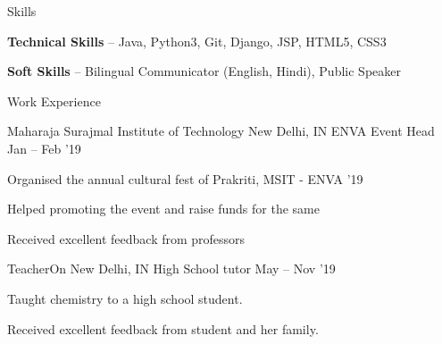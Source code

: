 \documentclass{resume} %
\begin{document}
\begin{rSection}{Skills}
  \begin{rSkillSection}
    \item \textbf {Technical Skills} -- Java, Python3, Git, Django, JSP, HTML5, CSS3
    \vspace{3mm}
    \item \textbf {Soft Skills} --  Bilingual Communicator (English, Hindi), Public Speaker
    \vspace{3mm}
  \end{rSkillSection}
\end{rSection}


\begin{rSection}{Work Experience}
  \begin{rWorkSection}{Maharaja Surajmal Institute of Technology}
                           {New Delhi, IN}
                           {ENVA Event Head}
                           {Jan -- Feb '19}
  {
    \item Organised the annual cultural fest of Prakriti, MSIT - ENVA '19
    \item Helped promoting the event and raise funds for the same
    \item Received excellent feedback from professors
  }
  \end{rWorkSection}


  \begin{rWorkSection}{TeacherOn}
                     {New Delhi, IN}
                     {High School tutor}
                     {May -- Nov '19}
  {
    \item Taught chemistry to a high school student.
    \item Received excellent feedback from student and her family.
  }
  \end{rWorkSection}
\end{rSection}

\end{document}
